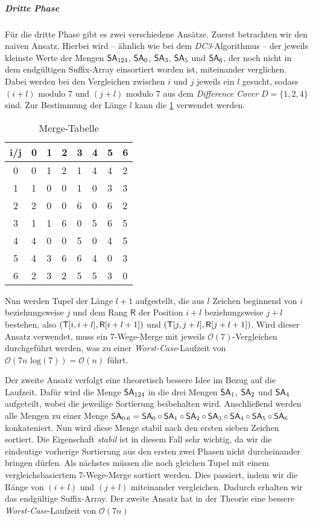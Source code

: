 \subparagraph*{Dritte Phase}

Für die dritte Phase gibt es zwei verschiedene Ansätze. Zuerst betrachten wir den naiven Ansatz. Hierbei wird -- ähnlich wie bei dem \emph{DC3}-Algorithmus -- der jeweils kleinste Werte der Mengen $\sa_{124}$, $\sa_0$, $\sa_3$, $\sa_5$ und  $\sa_6$, der noch nicht in dem endgültigen Suffix-Array einsortiert worden ist, miteinander verglichen. Dabei werden bei den Vergleichen zwischen $i$ und $j$ jeweils ein $l$ gesucht, sodass $(i + l) \text{ modulo } 7$ und $(j + l) \text{ modulo } 7$ aus dem \emph{Difference Cover} $D = \{1, 2, 4\}$ sind. Zur Bestimmung der Länge $l$ kann die \cref{tab:merge} verwendet werden.

\begin{table}[H]
	\centering
	\begin{tabular}{c|lllllll}
		i/j & 0 & 1 & 2 & 3 & 4 & 5 & 6 \\\hline
		0   & 0 & 1 & 2 & 1 & 4 & 4 & 2 \\
		1   & 1 & 0 & 0 & 1 & 0 & 3 & 3 \\
		2   & 2 & 0 & 0 & 6 & 0 & 6 & 2 \\
		3   & 1 & 1 & 6 & 0 & 5 & 6 & 5 \\
		4   & 4 & 0 & 0 & 5 & 0 & 4 & 5 \\
		5   & 4 & 3 & 6 & 6 & 4 & 0 & 3 \\
		6   & 2 & 3 & 2 & 5 & 5 & 3 & 0
	\end{tabular}
	\caption{Merge-Tabelle}
	\label{tab:merge}
\end{table}

Nun werden Tupel der Länge $l+1$ aufgestellt, die aus $l$ Zeichen beginnend von $i$ beziehungsweise $j$ und dem Rang $\mathsf{R}$ der Position $i+l$ beziehungsweise $j+l$ bestehen, also $(\inputtext[i, i+l], \mathsf{R}[i+l+1])$ und $(\inputtext[j, j+l], \mathsf{R}[j+l+1])$. Wird dieser Ansatz verwendet, muss ein 7-Wege-Merge mit jeweils $\mathcal{O}(7)$-Vergleichen durchgeführt werden, was zu einer \emph{Worst-Case}-Laufzeit von $\mathcal{O}(7n \text{ log} (7)) = \mathcal{O}(n) $ führt.

Der zweite Ansatz verfolgt eine theoretisch bessere Idee im Bezug auf die Laufzeit. Dafür wird die Menge $\sa_{124}$ in die drei Mengen $\sa_1$, $\sa_2$ und $\sa_4$ aufgeteilt, wobei die jeweilige Sortierung beibehalten wird. Anschließend werden alle Mengen zu einer Menge $\sa_{0:6} = \sa_0 \circ \sa_1 \circ \sa_2 \circ \sa_3 \circ \sa_4 \circ \sa_5 \circ \sa_6$ konkateniert. Nun wird diese Menge stabil nach den ersten sieben Zeichen sortiert. Die Eigenschaft \emph{stabil} ist in diesem Fall sehr wichtig, da wir die eindeutige vorherige Sortierung aus den ersten zwei Phasen nicht durcheinander bringen dürfen. Als nächstes müssen die noch gleichen Tupel mit einem vergleichsbasiertem $7$-Wege-Merge sortiert werden. Dies passiert, indem wir die Ränge von $(i+l)$ und $(j+l)$ miteinander vergleichen. Dadurch erhalten wir das endgültige Suffix-Array. Der zweite Ansatz hat in der Theorie eine bessere \emph{Worst-Case}-Laufzeit von $\mathcal{O}(7n)$

